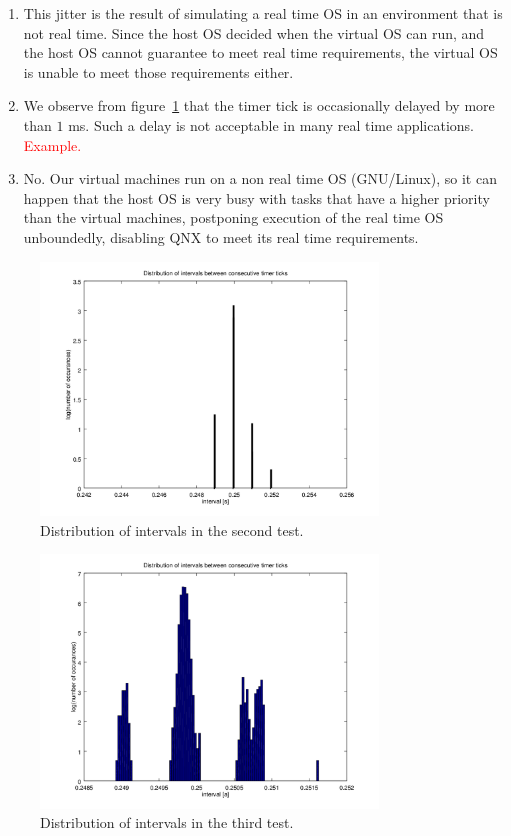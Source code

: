 \documentclass[a4paper,twoside,11pt]{article}
\newcommand{\todo}[1]{{\Large\sc\textcolor{red}{#1}}}
\begin{document}
\begin{enumerate}
 \item This jitter is the result of simulating a real time OS in an environment that is not real time. Since the host OS decided when the virtual OS can run, and the host OS cannot guarantee to meet real time requirements, the virtual OS is unable to meet those requirements either.
 
 \item We observe from figure~\ref{fig:interval-jitter} that the timer tick is occasionally delayed by more than $1$ ms. Such a delay is not acceptable in many real time applications. \todo{Example.}
 
 \item No. Our virtual machines run on a non real time OS (GNU/Linux), so it can happen that the host OS is very busy with tasks that have a higher priority than the virtual machines, postponing execution of the real time OS unboundedly, disabling QNX to meet its real time requirements.
 
\end{enumerate}

\begin{figure}
 \centering
 \includegraphics[width=0.8\textwidth]{./img/interval-jitter.png}
 \caption{Distribution of intervals in the second test.}
 \label{fig:interval-jitter}
\end{figure}
\begin{figure}
 \centering
 \includegraphics[width=0.8\textwidth]{./img/interval-jitter2.png}
 \caption{Distribution of intervals in the third test.}
 \label{fig:interval-jitter2}
\end{figure}
\end{document}
